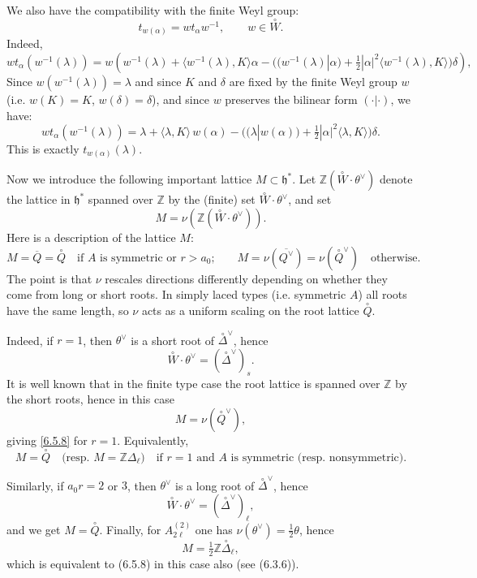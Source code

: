 \documentclass[12pt]{article}
\begin{document}
We also have the compatibility with the finite Weyl group:
\begin{equation}
    t_{w(\alpha)} = w t_\alpha w^{-1}, \qquad w \in \overset{\circ}{W}.
\end{equation}
Indeed,
\[
    w t_\alpha (w^{-1}(\lambda)) 
    = w\!\left(w^{-1}(\lambda) + \langle w^{-1}(\lambda), K \rangle \alpha 
        - \big( (w^{-1}(\lambda)|\alpha) 
           + \tfrac{1}{2}|\alpha|^2 \langle w^{-1}(\lambda), K\rangle \big)\delta\right),
\] 	
Since $w(w^{-1}(\lambda)) = \lambda$ and since $K$ and $\delta$ are fixed by the finite Weyl group $w$ (i.e. $w(K)=K$, $w(\delta)=\delta$), and since $w$ preserves the bilinear form $(\cdot|\cdot)$, we have:
\[
w t_\alpha(w^{-1}(\lambda)) = \lambda + \langle\lambda,K\rangle\, w(\alpha) - \Big((\lambda|w(\alpha)) + \tfrac12|\alpha|^2\langle \lambda,K\rangle\Big)\delta.
\]
This is exactly $t_{w(\alpha)}(\lambda)$.

Now we introduce the following important lattice $M \subset \mathfrak{h}^*$. Let $\mathbb{Z}(\overset{\circ}{W}\cdot \theta^\vee)$ denote the lattice in $\mathfrak{h}^*$
spanned over $\mathbb{Z}$ by the (finite) set $\overset{\circ}{W}\cdot \theta^\vee$, and set
\[
    M = \nu(\mathbb{Z}(\overset{\circ}{W}\cdot \theta^\vee)).
\]
Here is a description of the lattice $M$:
\begin{equation} \label{6.5.8}
    M = \overline{Q} = \overset{\circ}{Q} \quad \text{if $A$ is symmetric or $r > a_0$;}
    \qquad 
    M = \nu(\overline{Q^\vee}) = \nu(\overset{\circ}{Q}^\vee) \quad \text{otherwise.}
\end{equation}
The point is that $\nu$ rescales directions differently depending on whether they come from long or short roots. In simply laced types (i.e. symmetric $A$) all roots have the same length, so $\nu$ acts as a uniform scaling on the root lattice $\overset{\circ}{Q}$. 

Indeed, if $r=1$, then $\theta^\vee$ is a short root of $\overset{\circ}{\Delta}^\vee$, hence 
\[
    \overset{\circ}{W}\cdot \theta^\vee = (\overset{\circ}{\Delta}^\vee)_s.
\]
It is well known that in the finite type case the root lattice is 
spanned over $\mathbb{Z}$ by the short roots, hence in this case 
\[
    M = \nu(\overset{\circ}{Q}^\vee),
\]
giving \eqref{6.5.8} for $r=1$. Equivalently,
\[
    M = \overset{\circ}{Q} \quad \text{(resp.\ $M = \mathbb{Z}\Delta_\ell$)} 
    \quad \text{if $r=1$ and $A$ is symmetric (resp.\ nonsymmetric).}
\]

Similarly, if $a_0 r = 2$ or $3$, then $\theta^\vee$ is a long root of $\overset{\circ}{\Delta}^\vee$, 
hence 
\[
    \overset{\circ}{W} \cdot \theta^\vee = (\overset{\circ}{\Delta}^\vee)_\ell,
\]
and we get $M = \overset{\circ}{Q}$. Finally, for $A_{2\ell}^{(2)}$ one has $\nu(\theta^\vee) = \tfrac12 \theta$, 
hence 
\[
    M = \tfrac12 \mathbb{Z} \overset{\circ}{\Delta}_\ell,
\]
which is equivalent to (6.5.8) in this case also (see (6.3.6)).  
\end{document}
